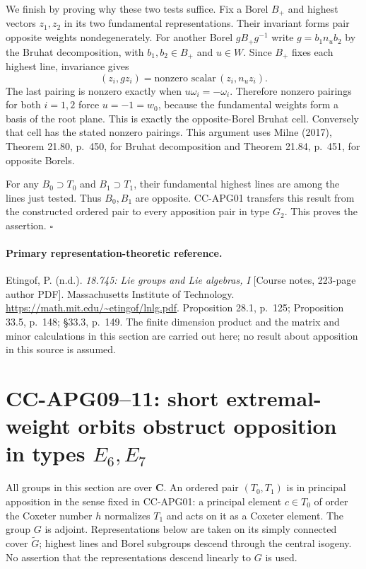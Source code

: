 \documentclass[11pt,a4paper]{article}
\theoremstyle{definition}\newtheorem{definition}[theorem]{Definition}
\theoremstyle{remark}\newtheorem{remark}[theorem]{Remark}
\begin{document}
We finish by proving why these two tests suffice.  Fix a
Borel $B_+$ and highest vectors $z_1,z_2$ in its two
fundamental representations.  Their invariant forms pair
opposite weights nondegenerately.  For another Borel
$gB_+g^{-1}$ write $g=b_1n_ub_2$ by the Bruhat
decomposition, with $b_1,b_2\in B_+$ and $u\in W$.
Since $B_+$ fixes each highest line, invariance gives
\[
             (z_i,gz_i)=\text{nonzero scalar}\,(z_i,n_uz_i).
\]
The last pairing is nonzero exactly when
$u\omega_i=-\omega_i$.  Therefore nonzero pairings for
both $i=1,2$ force $u=-1=w_0$, because the fundamental
weights form a basis of the root plane.  This is exactly
the opposite-Borel Bruhat cell.  Conversely that cell
has the stated nonzero pairings.  This argument uses
Milne (2017), Theorem 21.80, p.~450, for Bruhat
decomposition and Theorem 21.84, p.~451, for opposite Borels.

For any $B_0\supset T_0$ and $B_1\supset T_1$, their
fundamental highest lines are among the lines just tested.
Thus $B_0,B_1$ are opposite.  CC-APG01 transfers this result
from the constructed ordered pair to every apposition pair
in type $G_2$.  This proves the assertion. $\square$

\paragraph{Primary representation-theoretic reference.}
Etingof, P. (n.d.). \emph{18.745: Lie groups and Lie algebras, I}
[Course notes, 223-page author PDF]. Massachusetts Institute
of Technology. \url{https://math.mit.edu/~etingof/lnlg.pdf}.
Proposition 28.1, p.~125; Proposition 33.5, p.~148;
\S33.3, p.~149.  The finite dimension product and the
matrix and minor calculations in this section are carried
out here; no result about apposition in this source is assumed.


\section{CC-APG09--11: short extremal-weight orbits obstruct opposition in types \(E_6,E_7\)}

All groups in this section are over \(\mathbf C\). An ordered pair
\((T_0,T_1)\) is in principal apposition in the sense fixed in
CC-APG01: a principal element \(c\in T_0\) of order the Coxeter
number \(h\) normalizes \(T_1\) and acts on it as a Coxeter element.
The group \(G\) is adjoint. Representations below are taken on its
simply connected cover \(\widetilde G\); highest lines and Borel
subgroups descend through the central isogeny. No assertion that
the representations descend linearly to \(G\) is used.
\end{document}
